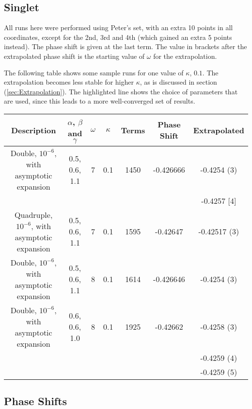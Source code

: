\documentclass[Dissertation.tex]{subfiles}
\begin{document}
\subsection{Singlet}
All runs here were performed using Peter's set, with an extra 10 points in all coordinates, except for the 2nd, 3rd and 4th (which gained an extra 5 points instead).  The phase shift is given at the last term.  The value in brackets after the extrapolated phase shift is the starting value of $\omega$ for the extrapolation.

The following table shows some sample runs for one value of $\kappa$, $0.1$.  The extrapolation becomes less stable for higher $\kappa$, as is discussed in section (\ref{sec:Extrapolation}).  The highlighted line shows the choice of parameters that are used, since this leads to a more well-converged set of results.

\begin{center}
\begin{tabular}{|c|c|c|c|c|c|c|}
\hline
Description & $\alpha$, $\beta$ and $\gamma$ & $\omega$ & $\kappa$ & Terms & Phase Shift & Extrapolated\\
\hline
\rowcolor{LightCyan} Double, $10^{-6}$, with asymptotic expansion & 0.5, 0.6, 1.1 & 7 & 0.1 & 1450 & -0.426666 & -0.4254 (3) \\
& & & & & & -0.4257 [4] \\
Quadruple, $10^{-6}$, with asymptotic expansion & 0.5, 0.6, 1.1 & 7 & 0.1 & 1595 & -0.42647 & -0.42517 (3) \\
Double, $10^{-6}$, with asymptotic expansion & 0.5, 0.6, 1.1 & 8 & 0.1 & 1614 & -0.426646 & -0.4254 (3) \\
Double, $10^{-6}$, with asymptotic expansion & 0.6, 0.6, 1.0 & 8 & 0.1 & 1925 & -0.42662 & -0.4258 (3) \\
& & & & & & -0.4259 (4) \\
& & & & & & -0.4259 (5) \\
\hline
\end{tabular}
\end{center}



\subsection{Phase Shifts}
\end{document}
